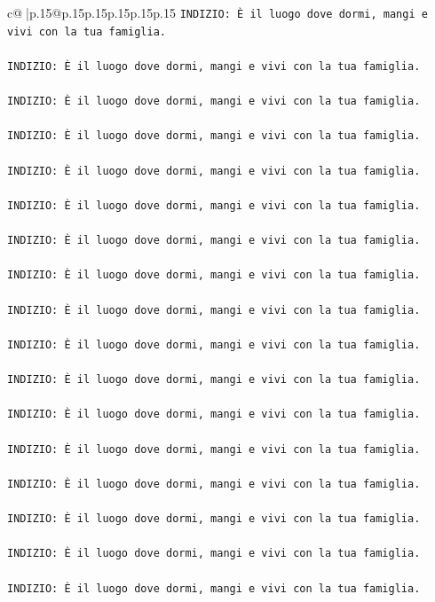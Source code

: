 \documentclass{article}
\begin{document}
{\begin{supertabular}{c@{$\;$}|p{.15\linewidth}@{}p{.15\linewidth}p{.15\linewidth}p{.15\linewidth}p{.15\linewidth}p{.15\linewidth}}
{{{\texttt{INDIZIO: È il luogo dove dormi, mangi e vivi con la tua famiglia.} \\
\\ 
\texttt{INDIZIO: È il luogo dove dormi, mangi e vivi con la tua famiglia.} \\
\\ 
\texttt{INDIZIO: È il luogo dove dormi, mangi e vivi con la tua famiglia.} \\
\\ 
\texttt{INDIZIO: È il luogo dove dormi, mangi e vivi con la tua famiglia.} \\
\\ 
\texttt{INDIZIO: È il luogo dove dormi, mangi e vivi con la tua famiglia.} \\
\\ 
\texttt{INDIZIO: È il luogo dove dormi, mangi e vivi con la tua famiglia.} \\
\\ 
\texttt{INDIZIO: È il luogo dove dormi, mangi e vivi con la tua famiglia.} \\
\\ 
\texttt{INDIZIO: È il luogo dove dormi, mangi e vivi con la tua famiglia.} \\
\\ 
\texttt{INDIZIO: È il luogo dove dormi, mangi e vivi con la tua famiglia.} \\
\\ 
\texttt{INDIZIO: È il luogo dove dormi, mangi e vivi con la tua famiglia.} \\
\\ 
\texttt{INDIZIO: È il luogo dove dormi, mangi e vivi con la tua famiglia.} \\
\\ 
\texttt{INDIZIO: È il luogo dove dormi, mangi e vivi con la tua famiglia.} \\
\\ 
\texttt{INDIZIO: È il luogo dove dormi, mangi e vivi con la tua famiglia.} \\
\\ 
\texttt{INDIZIO: È il luogo dove dormi, mangi e vivi con la tua famiglia.} \\
\\ 
\texttt{INDIZIO: È il luogo dove dormi, mangi e vivi con la tua famiglia.} \\
\\ 
\texttt{INDIZIO: È il luogo dove dormi, mangi e vivi con la tua famiglia.} \\
\\ 
\texttt{INDIZIO: È il luogo dove dormi, mangi e vivi con la tua famiglia.} \\
}}}
\end{supertabular}}
\end{document}
